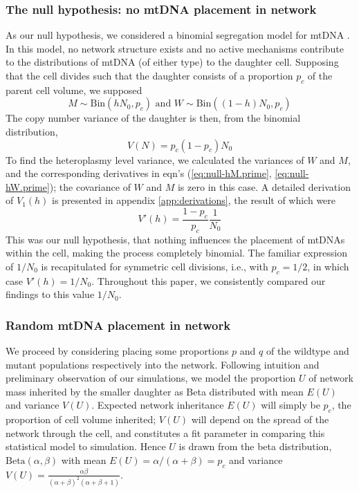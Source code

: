 \documentclass{article}
\newcommand{\be}{\begin{equation}}
\newcommand{\ee}{\end{equation}}
\begin{document}
\subsubsection*{The null hypothesis: no mtDNA placement in network}
As our null hypothesis, we considered a binomial segregation model for mtDNA \citep{johnston2019varied}. In this model, no network structure exists and no active mechanisms contribute to the distributions of mtDNA (of either type) to the daughter cell. Supposing that the cell divides such that the daughter consists of a proportion $p_c$ of the parent cell volume, we supposed
\be\label{eq:null-hyp}
M\sim \mathrm{Bin}(hN_0,p_c) \text{ and } W\sim\mathrm{Bin}((1-h)N_0,p_c)
\ee
The copy number variance of the daughter is then, from the binomial distribution,
\begin{equation}\label{eq:mtCN_null}
    V(N)=p_c(1-p_c)N_0
\end{equation}
To find the heteroplasmy level variance, we calculated the variances of $W$ and $M$, and the corresponding derivatives in eqn's (\ref{eq:null-hM.prime}, \ref{eq:null-hW.prime}); the covariance of $W$ and $M$ is zero in this case. A detailed derivation of $V_1(h)$ is presented in appendix \ref{app:derivations}, the result of which were
\begin{equation}\label{eq:NullHyp}
V'(h)=\frac{1-p_c}{p_c} \frac{1}{N_0}
\end{equation}
This was our null hypothesis, that nothing influences the placement of mtDNAs within the cell, making the process completely binomial. The familiar expression of $1/N_0$ is recapitulated for symmetric cell divisions, i.e., with $p_c=1/2$, in which case $V'(h)=1/N_0$. Throughout this paper, we consistently compared our findings to this value $1/N_0$.

\subsubsection*{Random mtDNA placement in network}
We proceed by considering placing some proportions $p$ and $q$ of the wildtype and mutant populations respectively into the network. Following intuition and preliminary observation of our simulations, we model the proportion $U$ of network mass inherited by the smaller daughter as Beta distributed with mean $E(U)$ and variance $V(U)$. Expected network inheritance $E(U)$ will simply be $p_c$, the proportion of cell volume inherited; $V(U)$ will depend on the spread of the network through the cell, and constitutes a fit parameter in comparing this statistical model to simulation. Hence $U$ is drawn from the beta distribution, $\mathrm{Beta}(\alpha,\beta)$ with mean $E(U) = \alpha/(\alpha+\beta) = p_c$ and variance $V(U) = \frac{\alpha\beta}{(\alpha+\beta)^2(\alpha+\beta+1)}$.
\end{document}
